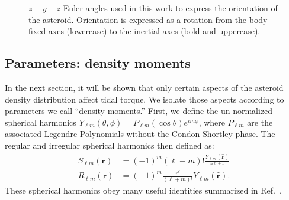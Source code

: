 \documentclass[fleqn,usenatbib]{mnras}
\newcommand{\unit}[1]{\bm{\hat{#1}}}
\begin{document}
\begin{figure}
    \centering
    \caption{$z-y-z$ Euler angles used in this work to express the orientation of the asteroid. Orientation is expressed as a rotation from the body-fixed axes (lowercase) to the inertial axes (bold and uppercase).}
    \label{fig:euler-angles}
\end{figure}


\subsection{Parameters: density moments}
\label{sec:moments}

In the next section, it will be shown that only certain aspects of the asteroid density distribution affect tidal torque. We isolate those aspects according to parameters we call ``density moments.'' First, we define the un-normalized spherical harmonics $Y_{\ell m}(\theta, \phi) = P_{\ell m}(\cos \theta)e^{im\phi}$, where $P_{\ell m}$ are the associated Legendre Polynomials without the Condon-Shortley phase. The regular and irregular spherical harmonics then defined as:
\begin{equation}
  \begin{split}
    S_{\ell m}(\bm r) &= (-1)^m (\ell - m)! \frac{Y_{\ell m}(\unit r)}{r^{\ell+1}} \\
    R_{\ell m} (\bm r) &= (-1)^m \frac{r^\ell}{(\ell + m)!} Y_{\ell m}(\unit r).
  \end{split}
\end{equation}
These spherical harmonics obey many useful identities summarized in Ref.~\cite{Gelderen1998TheSO}.
\end{document}
